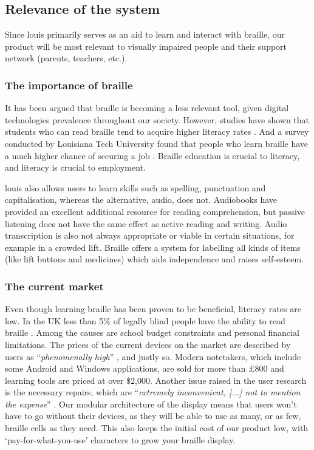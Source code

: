 \documentclass{article}
\begin{document}
\subsection{Relevance of the system} 

Since louis primarily serves as an aid to learn and interact with braille, our product will be most relevant to visually impaired people and their support network (parents, teachers, etc.).

\subsubsection{The importance of braille}

It has been argued that braille is becoming a less relevant tool, given digital technologies prevalence throughout our society. However, studies have shown that students who can read braille tend to acquire higher literacy rates \cite{earlybraille}. And a survey conducted by Louisiana Tech University found that people who learn braille have a much higher chance of securing a job \cite{transformingbraille}. Braille education is crucial to literacy, and literacy is crucial to employment.

louis also allows users to learn skills such as spelling, punctuation and capitalisation, whereas the alternative, audio, does not. Audiobooks have provided an excellent additional resource for reading comprehension, but passive listening does not have the same effect as active reading and writing. Audio transcription is also not always appropriate or viable in certain situations, for example in a crowded lift. Braille offers a system for labelling all kinds of items (like lift buttons and medicines) which aids independence and raises self-esteem.

\subsubsection{The current market}

Even though learning braille has been proven to be beneficial, literacy rates are low. In the UK less than 5\% of legally blind people have the ability to read braille \cite{brailleprofiling}. Among the causes are school budget constraints and personal financial limitations. The prices of the current devices on the market are described by users as ``\emph{phenomenally high}'' \cite{brailledisplays}, and justly so. Modern notetakers, which include some Android and Windows applications, are sold for more than \pounds 800 and learning tools are priced at over \$2,000. Another issue raised in the user research is the necessary repairs, which are ``\emph{extremely inconvenient, [...] not to mention the expense}'' \cite{brailledisplays}. Our modular architecture of the display means that users won't have to go without their devices, as they will be able to use as many, or as few, braille cells as they need. This also keeps the initial cost of our product low, with `pay-for-what-you-use' characters to grow your braille display.
\end{document}
